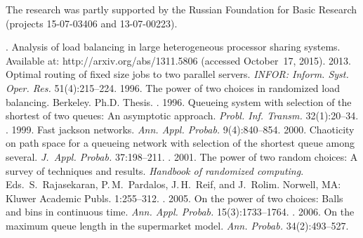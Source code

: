 


\Ack
\noindent
The research was partly supported by the Russian Foundation for Basic Research (projects 15-07-03406
 and 13-07-00223).



  \begin{multicols}{2}

\renewcommand{\bibname}{\protect\rmfamily References}

{\small\frenchspacing
 {%
 \begin{thebibliography}{99}
    . Analysis of load balancing in large 
heterogeneous processor sharing systems. Available at: {\sf http://arxiv.org/abs/1311.5806} 
(accessed October~17, 2015).
     2013. Optimal routing of fixed size jobs to two parallel 
servers. \textit{INFOR: Inform. Syst. Oper. Res.} 51(4):215--224.
     1996. The power of two choices in randomized load balancing. 
Berkeley. Ph.D. Thesis. 
    . 1996. Queueing 
system with selection of the shortest of two queues: An asymptotic approach. \textit{Probl. Inf. 
Transm.} 32(1):20--34.
    . 1999. Fast jackson networks. \textit{Ann. Appl. 
Probab.}  9(4):840--854.
     2000. Chaoticity on path space for a queueing network with selection of 
the shortest queue among several. \textit{J.~Appl. Probab.} 37:198--211.
    . 2001. The power of two random 
choices: A survey of techniques and results. \textit{Handbook of randomized computing}. 
 Eds.\  S.~Rajasekaran, P.\,M.~Pardalos,  J.\,H.~Reif, and J.~Rolim. 
 Norwell, MA: Kluwer Academic Publs. 1:255--312.
    . 2005. On the power of two choices: Balls and bins 
in continuous time. \textit{Ann. Appl. Probab.} 15(3):1733--1764.
    . 2006. On the maximum queue length in the 
supermarket model. \textit{Ann. Probab.} 34(2):493--527.
   

\end{thebibliography}}}
\end{multicols}
